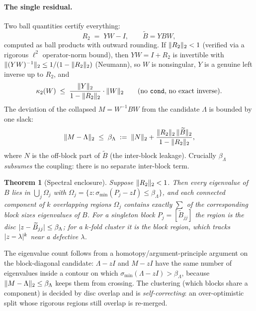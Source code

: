 \documentclass[11pt]{article}
\newtheorem{theorem}{Theorem}
\newcommand{\sigmin}{\sigma_{\min}}
\DeclarePairedDelimiter{\norm}{\lVert}{\rVert}
\DeclarePairedDelimiter{\abs}{\lvert}{\rvert}
\begin{document}
\paragraph{The single residual.} Two ball quantities certify everything:
\begin{equation}\label{eq:residuals}
  R_2 \;=\; Y W - I, \qquad \widetilde B = Y B W,
\end{equation}
computed as ball products with outward rounding. If $\norm{R_2}_2<1$ (verified via a rigorous
$\ell^2$ operator-norm bound), then $YW=I+R_2$ is invertible with
$\norm{(YW)^{-1}}_2\le 1/(1-\norm{R_2}_2)$ (Neumann), so $W$ is nonsingular, $Y$ is a genuine
left inverse up to $R_2$, and
\begin{equation}\label{eq:kappa}
  \kappa_2(W) \;\le\; \frac{\norm{Y}_2}{1-\norm{R_2}_2}\cdot\norm{W}_2
  \qquad(\text{no \texttt{cond}, no exact inverse}).
\end{equation}
The deviation of the collapsed $M=W^{-1}BW$ from the candidate $\Lambda$ is bounded by one slack:
\begin{equation}\label{eq:blockdev}
  \norm{M-\Lambda}_2 \;\le\; \beta_\Lambda
  \;:=\; \norm{N}_2 + \frac{\norm{R_2}_2\,\norm{\widetilde B}_2}{1-\norm{R_2}_2},
\end{equation}
where $N$ is the off-block part of $\widetilde B$ (the inter-block leakage). Crucially $\beta_\Lambda$
\emph{subsumes} the coupling: there is no separate inter-block term.

\begin{theorem}[Spectral enclosure]\label{thm:enclosure}
Suppose $\norm{R_2}_2<1$. Then every eigenvalue of $B$ lies in
$\bigcup_j\Omega_j$ with $\Omega_j=\{z:\sigmin(P_j-zI)\le \beta_\Lambda\}$, and each connected
component of $k$ overlapping regions $\Omega_j$ contains exactly $\sum$ of the corresponding block
sizes eigenvalues of $B$. For a singleton block $P_j=[\widetilde B_{jj}]$ the region is the disc
$\abs{z-\widetilde B_{jj}}\le\beta_\Lambda$; for a $k$-fold cluster it is the block region, which
tracks $\abs{z-\lambda}^k$ near a defective $\lambda$.
\end{theorem}

The eigenvalue count follows from a homotopy/argument-principle argument on the block-diagonal
candidate: $\Lambda-zI$ and $M-zI$ have the same number of eigenvalues inside a contour on which
$\sigmin(\Lambda-zI)>\beta_\Lambda$, because $\norm{M-\Lambda}_2\le\beta_\Lambda$ keeps them from
crossing. The clustering (which blocks share a component) is decided by disc overlap and is
\emph{self-correcting}: an over-optimistic split whose rigorous regions still overlap is re-merged.
\end{document}
